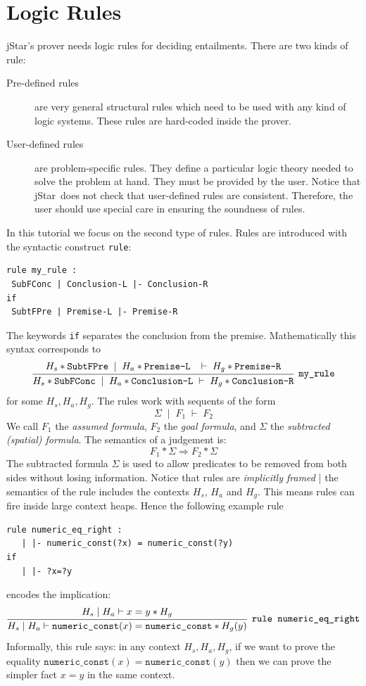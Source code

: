 \documentclass[11pt]{article}
\newcommand{\jStar}{{\sf jStar}}
\begin{document}
\section{Logic Rules}
\label{sec:logic-rules}
\jStar's  prover needs logic rules for deciding entailments. There are
two kinds of rule:
%
\begin{description}
\item[Pre-defined rules] are very general structural rules which need
  to be used with any kind of logic systems. These
  rules are hard-coded inside the prover.
\item[User-defined rules] are problem-specific rules. They define a
  particular logic theory needed to solve the problem at hand. They
  must be provided by the user. Notice that \jStar \ does not check that user-defined rules are 
  consistent. Therefore, the user should use special care in ensuring the soundness of rules.
\end{description} 
In this tutorial we focus on the second type of rules. Rules are introduced with
the syntactic construct {\tt rule}:
\begin{verbatim}
rule my_rule :
 SubFConc | Conclusion-L |- Conclusion-R 
if 
 SubtFPre | Premise-L |- Premise-R
  \end{verbatim}
The keywords {\tt if} separates the conclusion from the premise.
Mathematically this syntax corresponds to
\[
\infer[\texttt{my\_rule}]
{ H_s * \texttt{SubFConc} \; \mid \; H_a *  \texttt{Conclusion-L}  \; \vdash \; H_g * \texttt{Conclusion-R} }
{ H_s * \texttt{SubtFPre} \; \mid \; H_a * \texttt{Premise-L } \; \vdash \; H_g * \texttt{Premise-R}} 
\] for some $H_s, H_a, H_g$. The rules work with sequents of the form
\[
\Sigma \; \mid \; F_1 \; \vdash \; F_2 
\]
We call $F_1$ the \emph{assumed formula}, $F_2$ the \emph{goal formula}, and $\Sigma$ the \emph{subtracted (spatial) formula}.  The semantics of a judgement is:
\[
F_1 *  \Sigma \Longrightarrow F_2 * \Sigma
\]
The subtracted formula $\Sigma$ is used to allow predicates to be
removed from both sides without losing information. 
Notice that rules are \emph{implicitly framed} | the semantics of the rule includes the contexts $H_s$, $H_a$ and $H_g$. This means rules can fire inside large context heaps. 
Hence the 
following example rule 
\begin{verbatim}
rule numeric_eq_right :
   | |- numeric_const(?x) = numeric_const(?y) 
if
   | |- ?x=?y
\end{verbatim}
encodes the implication:
\[
\infer[\texttt{rule numeric\_eq\_right}]{ H_s  \mid H_a \vdash \texttt{numeric\_const}(x) = \texttt{numeric\_const} * H_g(y)}{ H_s  \mid H_a \vdash x=y * H_g}
\]
Informally, this rule says: in any context $H_s, H_a, H_g$, if we want to prove the equality $\texttt{numeric\_const}(x) = \texttt{numeric\_const}(y)$ then we can prove the simpler fact $x=y$ in the same context.
\end{document}
